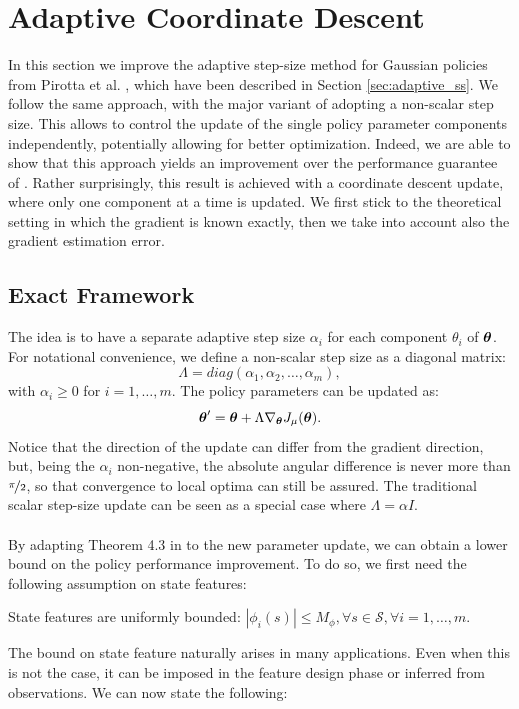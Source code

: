 \section{Adaptive Coordinate Descent}
In this section we improve the adaptive step-size method for Gaussian policies from Pirotta et al. \cite{NIPS2013_5186}, which have been described in Section \ref{sec:adaptive_ss}. We follow the same approach, with the major variant of adopting a non-scalar step size. This allows to control the update of the single policy parameter components independently, potentially allowing for better optimization. Indeed, we are able to show that this approach yields an improvement over the performance guarantee of \cite{NIPS2013_5186}. Rather surprisingly, this result is achieved with a coordinate descent update, where only one component at a time is updated. 
We first stick to the theoretical setting in which the gradient is known exactly, then we take into account also the gradient estimation error.


\subsection{Exact Framework}
The idea is to have a separate adaptive step size $\alpha_i$ for each component $\theta_i$ of $\boldsymbol{\theta}$. For notational convenience, we define a non-scalar step size as a diagonal matrix:
\[
\Lambda=diag(\alpha_1, \alpha_2,\dotsc, \alpha_m),
\] 
with $\alpha_i \geq 0$ for $i=1,\dotsc,m$. The policy parameters can be updated as:
\[
\boldsymbol{\theta}'=\boldsymbol{\theta}+\Lambda\nabla_{\boldsymbol{\theta}}J_\mu(\boldsymbol{\theta}).
\]
Notice that the direction of the update can differ from the gradient direction, but, being the $\alpha_i$ non-negative, the absolute angular difference is never more than $\nicefrac{\pi}{2}$, so that convergence to local optima can still be assured.
The traditional scalar step-size update can be seen as a special case where $\Lambda = \alpha I$.
\paragraph{}
By adapting Theorem 4.3 in \cite{NIPS2013_5186} to the new parameter update, we can obtain a lower bound on the policy performance improvement. To do so, we first need the following assumption on state features:
\begin{assumption}\label{assum:1}
State features are uniformly bounded:
$|\phi_i(s)| \leq M_{\phi}, \forall s \in \mathcal{S}, \forall i=1,\dotsc,m$.
\end{assumption}
The bound on state feature naturally arises in many applications. Even when this is not the case, it can be imposed in the feature design phase or inferred from observations. 
We can now state the following:

